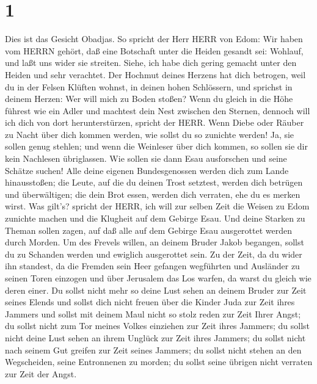 \hypertarget{section}{%
\section{1}\label{section}}

 Dies ist das Gesicht Obadjas. So spricht der Herr HERR von
Edom: Wir haben vom HERRN gehört, daß eine Botschaft unter die Heiden
gesandt sei: Wohlauf, und laßt uns wider sie streiten. 
Siehe, ich habe dich gering gemacht unter den Heiden und sehr verachtet.
 Der Hochmut deines Herzens hat dich betrogen, weil du in
der Felsen Klüften wohnst, in deinen hohen Schlössern, und sprichst in
deinem Herzen: Wer will mich zu Boden stoßen?  Wenn du
gleich in die Höhe führest wie ein Adler und machtest dein Nest zwischen
den Sternen, dennoch will ich dich von dort herunterstürzen, spricht der
HERR.  Wenn Diebe oder Räuber zu Nacht über dich kommen
werden, wie sollst du so zunichte werden! Ja, sie sollen genug stehlen;
und wenn die Weinleser über dich kommen, so sollen sie dir kein
Nachlesen übriglassen.  Wie sollen sie dann Esau ausforschen
und seine Schätze suchen!  Alle deine eigenen Bundesgenossen
werden dich zum Lande hinausstoßen; die Leute, auf die du deinen Trost
setztest, werden dich betrügen und überwältigen; die dein Brot essen,
werden dich verraten, ehe du es merken wirst.  Was gilt's?
spricht der HERR, ich will zur selben Zeit die Weisen zu Edom zunichte
machen und die Klugheit auf dem Gebirge Esau.  Und deine
Starken zu Theman sollen zagen, auf daß alle auf dem Gebirge Esau
ausgerottet werden durch Morden.  Um des Frevels willen, an
deinem Bruder Jakob begangen, sollst du zu Schanden werden und ewiglich
ausgerottet sein.  Zu der Zeit, da du wider ihn standest,
da die Fremden sein Heer gefangen wegführten und Ausländer zu seinen
Toren einzogen und über Jerusalem das Los warfen, da warst du gleich wie
deren einer.  Du sollst nicht mehr so deine Lust sehen an
deinem Bruder zur Zeit seines Elends und sollst dich nicht freuen über
die Kinder Juda zur Zeit ihres Jammers und sollst mit deinem Maul nicht
so stolz reden zur Zeit Ihrer Angst;  du sollst nicht zum
Tor meines Volkes einziehen zur Zeit ihres Jammers; du sollst nicht
deine Lust sehen an ihrem Unglück zur Zeit ihres Jammers; du sollst
nicht nach seinem Gut greifen zur Zeit seines Jammers;  du
sollst nicht stehen an den Wegscheiden, seine Entronnenen zu morden; du
sollst seine übrigen nicht verraten zur Zeit der Angst. 
